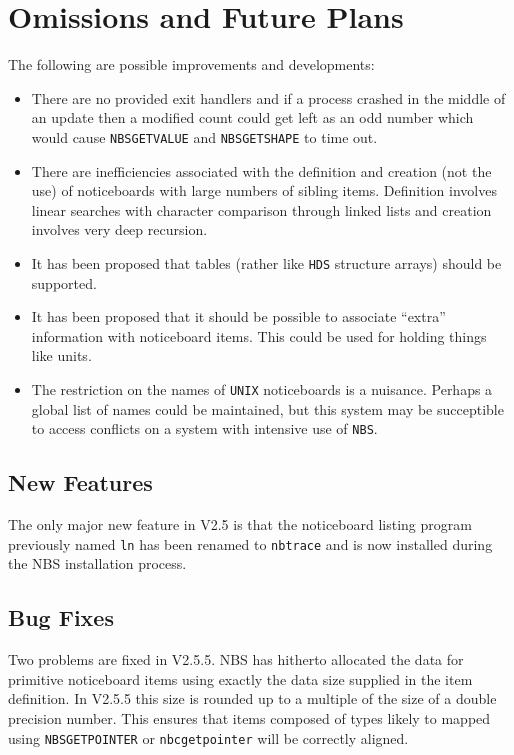 \documentclass[twoside,11pt]{article}
\renewcommand{\_}{\texttt{\symbol{95}}}
\begin{document}
\section {Omissions and Future Plans}

The following are possible improvements and developments:

\begin {itemize}
\item There are no provided exit handlers and if a process crashed in the
middle of an update then a modified count could get left as an odd number which
would cause {\tt NBS\_GET\_VALUE} and {\tt NBS\_GET\_SHAPE} to time out.
\item There are inefficiencies associated with the definition and creation
(not the use) of noticeboards with large numbers of sibling items. Definition
involves linear searches with character comparison through linked lists
and creation involves very deep recursion.
\item It has been proposed that tables (rather like {\tt HDS} structure arrays)
should be supported.
\item It has been proposed that it should be possible to associate ``extra''
information with noticeboard items. This could be used for holding things like
units.
\item The restriction on the names of {\tt UNIX} noticeboards is a
nuisance. Perhaps a global list of names could be maintained, but this
system may be succeptible to access conflicts on a system with intensive
use of {\tt NBS}.
\end {itemize}

\subsection{New Features}
\label{V2.5 New Features}
The only major new feature in V2.5 is that the noticeboard listing
program previously named {\tt ln} has been renamed to {\tt nbtrace} and
is now installed during the NBS installation process.

\subsection {Bug Fixes}

Two problems are fixed in V2.5.5. NBS has hitherto allocated the data for
primitive noticeboard items using exactly the data size supplied in the
item definition. In V2.5.5 this size is rounded up to a multiple of the
size of a double precision number. This ensures that items composed of
types likely to mapped using {\tt NBS\_GET\_POINTER} or
{\tt nbc\_get\_pointer} will be correctly aligned.
\end{document}
